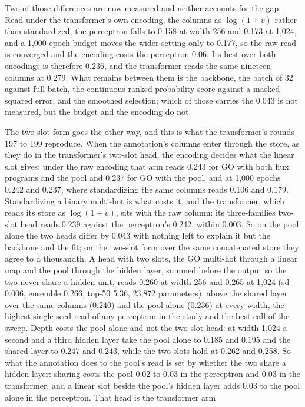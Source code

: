 Two of those differences are now measured and neither accounts for the gap. Read under
the transformer's own encoding, the columns as $\log(1+v)$ rather than standardized, the
perceptron falls to 0.158 at width 256 and 0.173 at 1,024, and a 1,000-epoch budget
moves the wider setting only to 0.177, so the raw read is converged and the encoding
costs the perceptron 0.06. Its best over both encodings is therefore 0.236, and the
transformer reads the same nineteen columns at 0.279. What remains between them is the
backbone, the batch of 32 against full batch, the continuous ranked probability score
against a masked squared error, and the smoothed selection; which of those carries the
0.043 is not measured, but the budget and the encoding do not.

The two-slot form goes the other way, and this is what the transformer's rounds 197 to
199 reproduce. When the annotation's columns enter through the store, as they do in the
transformer's two-slot head, the encoding decides what the linear slot gives: under the
raw encoding that arm reads 0.243 for GO with both flux programs and the pool and 0.237
for GO with the pool, and at 1,000 epochs 0.242 and 0.237, where standardizing the same
columns reads 0.106 and 0.179. Standardizing a binary multi-hot is what costs it, and
the transformer, which reads its store as $\log(1+v)$, sits with the raw column: its
three-families two-slot head reads 0.239 against the perceptron's 0.242, within 0.003.
So on the pool alone the two heads differ by 0.043 with nothing left to explain it but
the backbone and the fit; on the two-slot form over the same concatenated store they
agree to a thousandth. A head with two slots, the GO multi-hot through a linear map and the
pool through the hidden layer, summed before the output so the two never share a
hidden unit, reads 0.260 at width 256 and 0.265 at 1,024 (sd 0.006, ensemble 0.266,
top-50 5.36, 23,872 parameters): above the shared layer over the same columns (0.240)
and the pool alone (0.236) at every width, the highest single-seed read of any
perceptron in the study and the best call of the sweep. Depth costs the pool alone
and not the two-slot head: at width 1,024 a second and a third hidden layer take the
pool alone to 0.185 and 0.195 and the shared layer to 0.247 and 0.243, while the two
slots hold at 0.262 and 0.258. So what the annotation does to the pool's read is set
by whether the two share a hidden layer: sharing costs the pool 0.02 to 0.03 in the
perceptron and 0.03 in the transformer, and a linear slot beside the pool's hidden
layer adds 0.03 to the pool alone in the perceptron. That head is the transformer arm
